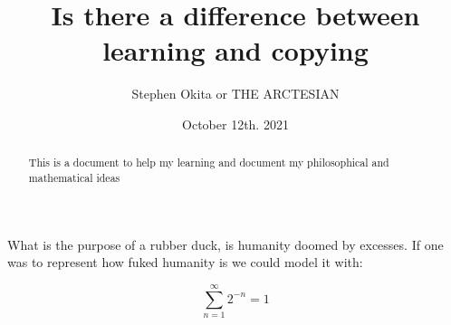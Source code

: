 \documentclass[12pt, letterpaper]{article}
\title{Is there a difference between learning and copying}
\author{Stephen Okita or THE ARCTESIAN}
\date{October 12th. 2021}
\begin{document}
\begin{titlepage}
    \maketitle
\end{titlepage}
\begin{abstract}
This is a document to help my learning and document my philosophical and mathematical ideas
\end{abstract}

\begin{center}
What is the purpose of a rubber duck, is humanity doomed by excesses. If one was to represent how fuked humanity is we could model it with: 
\end{center}
\[ \sum_{n=1}^{\infty} 2^{-n} = 1 \]
\end{document}
